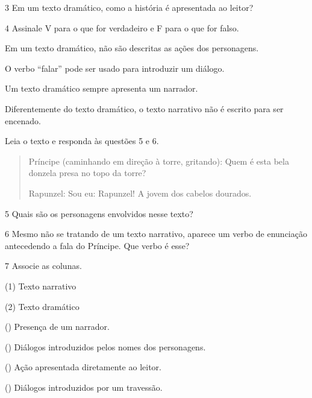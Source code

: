 
\num{3} Em um texto dramático, como a história é apresentada ao leitor?


\num{4} Assinale V para o que for verdadeiro e F para o que for falso.

\begin{boxlist}
 Em um texto dramático, não são descritas as ações dos personagens.

 O verbo “falar” pode ser usado para introduzir um diálogo.

 Um texto dramático sempre apresenta um narrador.

 Diferentemente do texto dramático, o texto narrativo não é escrito para ser encenado.
\end{boxlist}

Leia o texto e responda às questões 5 e 6.

\begin{quote}
Príncipe (caminhando em direção à torre, gritando): Quem é esta bela
donzela presa no topo da torre?

Rapunzel: Sou eu: Rapunzel! A jovem dos cabelos dourados.
\end{quote}

\num{5} Quais são os personagens envolvidos nesse texto?


\num{6} Mesmo não se tratando de um texto narrativo, aparece um verbo de enunciação antecedendo a fala do Príncipe. Que verbo é esse?


\pagebreak
\num{7} Associe as colunas.

{\setlength{\columnsep}{-5cm}
\begin{multicols}{2}
(1) Texto narrativo

(2) Texto dramático

\columnbreak

({}) Presença de um narrador.

({}) Diálogos introduzidos pelos nomes dos personagens.

({}) Ação apresentada diretamente ao leitor.

({}) Diálogos introduzidos por um travessão.
\end{multicols}
}

